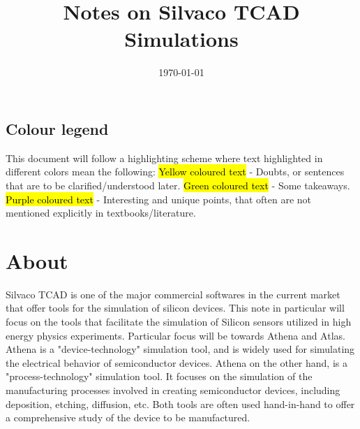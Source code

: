 \documentclass[11pt]{article}
\title{Notes on Silvaco TCAD Simulations}
\date{\today}
\newcommand{\hlyellow}[1]{{\sethlcolor{yellow}\hl{#1}}}
\newcommand{\hlgreen}[1]{{\sethlcolor{green2}\hl{#1}}}
\newcommand{\hlred}[1]{{\sethlcolor{red2}\hl{#1}}}
\newcommand{\hlpurple}[1]{{\sethlcolor{purple2}\hl{#1}}}
\begin{document}
\maketitle
\tableofcontents

\newpage


\subsection*{Colour legend}
This document will follow a highlighting scheme where text highlighted in different colors mean the following:
\newline
\hlyellow{Yellow coloured text} - Doubts, or sentences that are to be clarified/understood later.\newline
\hlgreen{Green coloured text} - Some takeaways.\newline
\hlpurple{Purple coloured text} - Interesting and unique points, that often are not mentioned explicitly in textbooks/literature.

\section{About}
Silvaco TCAD is one of the major commercial softwares in the current market that offer tools for the simulation of silicon devices. This note in particular will focus on the tools that facilitate the simulation of Silicon sensors utilized in high energy physics experiments. Particular focus will be towards Athena and Atlas. Athena is a "device-technology" simulation tool, and is widely used for simulating the electrical behavior of semiconductor devices. Athena on the other hand, is a "process-technology" simulation tool. It focuses on the simulation of the manufacturing processes involved in creating semiconductor devices, including deposition, etching, diffusion, etc. Both tools are often used hand-in-hand to offer a comprehensive study of the device to be manufactured.
\end{document}
